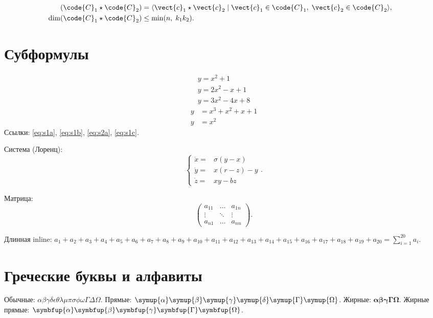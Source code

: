 \documentclass[font=modern]{cmcmsuthesis-phd}
\begin{document}
\begin{equation}\label{eq:hadamard}\begin{alignedat}{2}
(\code{C}_1\star\code{C}_2)&=\langle\vect{c}_1\star\vect{c}_2\mid\vect{c}_1\in\code{C}_1,\;\vect{c}_2\in\code{C}_2\rangle,&\quad&\\
\dim(\code{C}_1\star\code{C}_2)&\leq\min(n,\;k_1 k_2).&&
\end{alignedat}\end{equation}

\section{Субформулы}
\begin{subequations}\label{eq:sub1}\begin{gather}y=x^2+1\label{eq:s1a}\\y=2x^2-x+1\label{eq:s1b}\\y=3x^2-4x+8\label{eq:s1c}\end{gather}\end{subequations}
\begin{subequations}\label{eq:sub2}\begin{align}y&=x^3+x^2+x+1\label{eq:s2a}\\y&=x^2\label{eq:s2b}\end{align}\end{subequations}
Ссылки: \eqref{eq:s1a}, \eqref{eq:s1b}, \eqref{eq:s2a}, \eqref{eq:s1c}.

Система (Лоренц): \[\left\{\begin{array}{rl}\dot x=&\sigma(y-x)\\\dot y=&x(r-z)-y\\\dot z=&xy-bz\end{array}\right..\]

Матрица: \[\left(\begin{array}{ccc}a_{11}&\ldots&a_{1n}\\\vdots&\ddots&\vdots\\a_{n1}&\ldots&a_{nn}\end{array}\right).\]

Длинная inline: $a_1+a_2+a_3+a_4+a_5+a_6+a_7+a_8+a_9+a_{10}+a_{11}+a_{12}+a_{13}+a_{14}+a_{15}+a_{16}+a_{17}+a_{18}+a_{19}+a_{20}=\sum_{i=1}^{20}a_i.$

\section{Греческие буквы и алфавиты}
Обычные: $\alpha\beta\gamma\delta\epsilon\theta\lambda\mu\pi\sigma\phi\omega\Gamma\Delta\Omega$.
Прямые: $\symup{\alpha}\symup{\beta}\symup{\gamma}\symup{\delta}\symup{\Gamma}\symup{\Omega}$.
Жирные: $\symbf{\alpha}\symbf{\beta}\symbf{\gamma}\symbf{\Gamma}\symbf{\Omega}$.
Жирные прямые: $\symbfup{\alpha}\symbfup{\beta}\symbfup{\gamma}\symbfup{\Gamma}\symbfup{\Omega}$.
\end{document}
